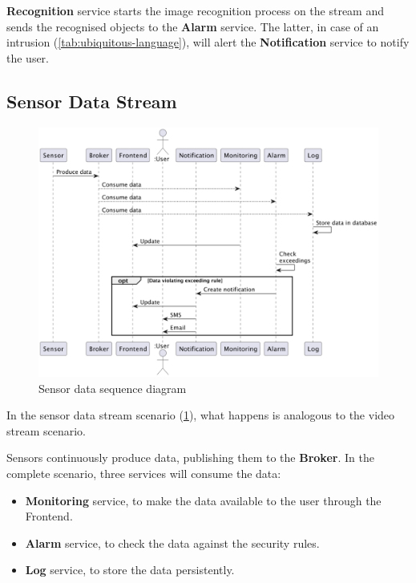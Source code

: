 \documentclass{scrartcl}
\begin{document}
    \textbf{Recognition} service starts the image recognition process on the stream and sends the recognised objects to the \textbf{Alarm} service.
    The latter, in case of an intrusion (\cref{tab:ubiquitous-language}), will alert the  \textbf{Notification} service to notify the user.

    \subsection{Sensor Data Stream}
    \begin{figure}
        \centering
        \includegraphics[scale=0.5]{img/sensor-data-sequence}
        \caption{Sensor data sequence diagram}
        \label{fig:sensor-data-sequence}
    \end{figure}

    In the sensor data stream scenario (\cref{fig:sensor-data-sequence}), what happens is analogous to the video stream scenario.

    Sensors continuously produce data, publishing them to the \textbf{Broker}.
    In the complete scenario, three services will consume the data:

    \begin{itemize}
        \item  \textbf{Monitoring} service, to make the data available to the user through the Frontend.
        \item  \textbf{Alarm} service, to check the data against the security rules.
        \item  \textbf{Log} service, to store the data persistently.
    \end{itemize}
\end{document}
